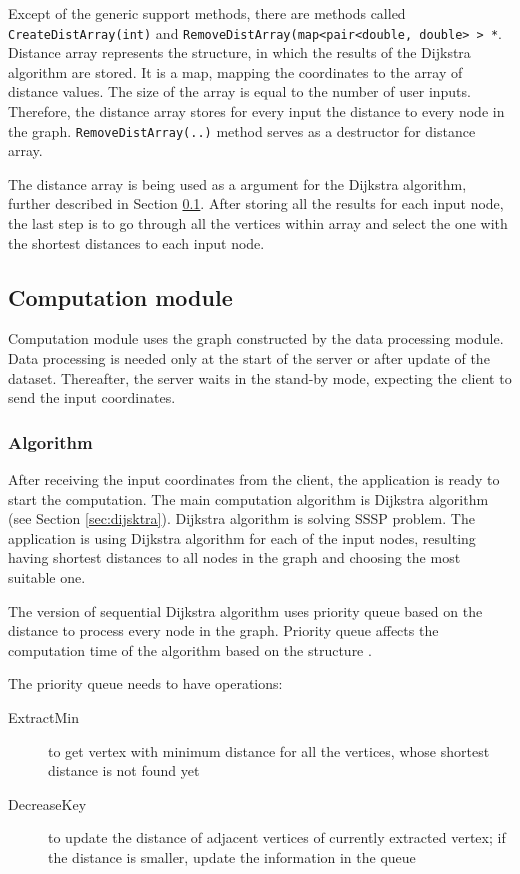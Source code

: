 \documentclass[thesis=M,english]{FITthesis}[2012/10/20]
\begin{document}
Except of the generic support methods, there are methods called \texttt{CreateDistArray(int)} and \texttt{RemoveDistArray(map<pair<double, double> > *}. Distance array represents the structure, in which the results of the Dijkstra algorithm are stored. It is a map, mapping the coordinates to the array of distance values. The size of the array is equal to the number of user inputs. Therefore, the distance array stores for every input the distance to every node in the graph. 
\texttt{RemoveDistArray(..)} method serves as a destructor for distance array.

The distance array is being used as a argument for the Dijkstra algorithm, further described in Section \ref{subsec:server_comp}. After storing all the results for each input node, the last step is to go through all the vertices within array and select the one with the shortest distances to each input node.


\subsection{Computation module}
\label{subsec:server_comp}
Computation module uses the graph constructed by the data processing module. Data processing is needed only at the start of the server or after update of the dataset. Thereafter, the server waits in the stand-by mode, expecting the client to send the input coordinates. 

\subsubsection{Algorithm}
After receiving the input coordinates from the client, the application is ready to start the computation. 
The main computation algorithm is Dijkstra algorithm (see Section \ref{sec:dijsktra}). Dijkstra algorithm is solving SSSP problem. The application is using Dijkstra algorithm for each of the input nodes, resulting having shortest distances to all nodes in the graph and choosing the most suitable one.

The version of sequential Dijkstra algorithm uses priority queue based on the distance to process every node in the graph. Priority queue affects the computation time of the algorithm based on the structure \cite{Chen07}. 

The priority queue needs to have operations:
\begin{description}

\item[ExtractMin] to get vertex with minimum distance for all the vertices, whose shortest distance is not found yet
\item[DecreaseKey] to update the distance of adjacent vertices of currently	extracted vertex; if the distance is smaller, update the information in the queue

\end{description}
\end{document}
